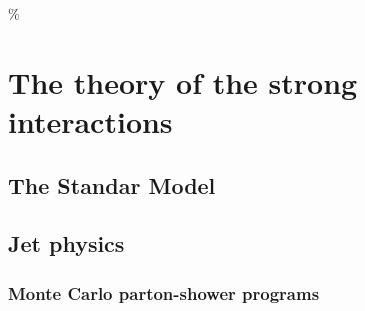 \%
%
%
\chapter{The theory of the strong interactions}

\section{The Standar Model}\label{sec:qcdintro}



\section{Jet physics}\label{sec:jets}

\subsection{Monte Carlo parton-shower programs}

